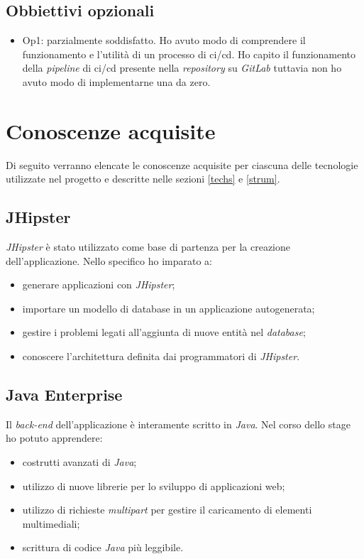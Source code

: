 \subsection{Obbiettivi opzionali}
\begin{itemize}
    \item Op1: parzialmente soddisfatto. Ho avuto modo di comprendere il funzionamento e l'utilità di un processo di \gls{ci}/\gls{cd}. Ho capito il funzionamento della \textit{pipeline} di \gls{ci}/\gls{cd} presente nella \textit{repository} su \textit{GitLab} tuttavia non ho avuto modo di implementarne una da zero.
\end{itemize}

\section{Conoscenze acquisite}
Di seguito verranno elencate le conoscenze acquisite per ciascuna delle tecnologie utilizzate nel progetto e descritte nelle sezioni \ref{techs} e \ref{strum}.

\subsection{JHipster}
\textit{JHipster} è stato utilizzato come base di partenza per la creazione dell'applicazione. Nello specifico ho imparato a:
\begin{itemize}
    \item generare applicazioni con \textit{JHipster};
    \item importare un modello di database in un applicazione autogenerata;
    \item gestire i problemi legati all'aggiunta di nuove entità nel \textit{database};
    \item conoscere l'architettura definita dai programmatori di \textit{JHipster}.
\end{itemize}

\subsection{Java Enterprise}
Il \textit{back-end} dell'applicazione è interamente scritto in \textit{Java}. Nel corso dello stage ho potuto apprendere:
\begin{itemize}
    \item costrutti avanzati di \textit{Java};
    \item utilizzo di nuove librerie per lo sviluppo di applicazioni web;
    \item utilizzo di richieste \textit{multipart} per gestire il caricamento di elementi multimediali;
    \item scrittura di codice \textit{Java} più leggibile.
\end{itemize}

